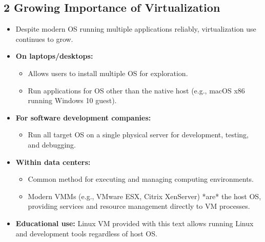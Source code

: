 \documentclass{article}
\begin{document}
\subsection*{2 Growing Importance of Virtualization}
\begin{itemize}
    \item Despite modern OS running multiple applications reliably, virtualization use continues to grow.
    \item \textbf{On laptops/desktops:}
    \begin{itemize}
        \item Allows users to install multiple OS for exploration.
        \item Run applications for OS other than the native host (e.g., macOS x86 running Windows 10 guest).
    \end{itemize}
    \item \textbf{For software development companies:}
    \begin{itemize}
        \item Run all target OS on a single physical server for development, testing, and debugging.
    \end{itemize}
    \item \textbf{Within data centers:}
    \begin{itemize}
        \item Common method for executing and managing computing environments.
        \item Modern VMMs (e.g., VMware ESX, Citrix XenServer) *are* the host OS, providing services and resource management directly to VM processes.
    \end{itemize}
    \item \textbf{Educational use:} Linux VM provided with this text allows running Linux and development tools regardless of host OS.
\end{itemize}
\end{document}
